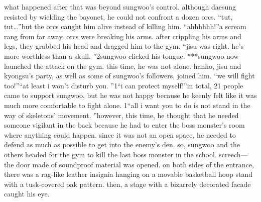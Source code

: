 what happened after that was beyond sungwoo’s control.
 although daesung resisted by wielding the bayonet, he could not confront a dozen orcs.
“tut, tut…”but the orcs caught him alive instead of killing him.
“ahhhhhh!”a scream rang from far away.
 orcs were breaking his arms.
 after crippling his arms and legs, they grabbed his head and dragged him to the gym.
“jisu was right.
 he’s more worthless than a skull.
”2sungwoo clicked his tongue.
***sungwoo now launched the attack on the gym.
 this time, he was not alone.
 hanho, jisu and kyongsu’s party, as well as some of sungwoo’s followers, joined him.
“we will fight too!”“at least i won’t disturb you.
”1“i can protect myself!”in total, 21 people came to support sungwoo, but he was not happy because he keenly felt like it was much more comfortable to fight alone.
1“all i want you to do is not stand in the way of skeletons’ movement.
”however, this time, he thought that he needed someone vigilant in the back because he had to enter the boss monster’s room where anything could happen.
since it was not an open space, he needed to defend as much as possible to get into the enemy’s den.
so, sungwoo and the others headed for the gym to kill the last boss monster in the school.
screech—the door made of soundproof material was opened.
on both sides of the entrance, there was a rag-like leather insignia hanging on a movable basketball hoop stand with a tusk-covered oak pattern.
 then, a stage with a bizarrely decorated facade caught his eye.

